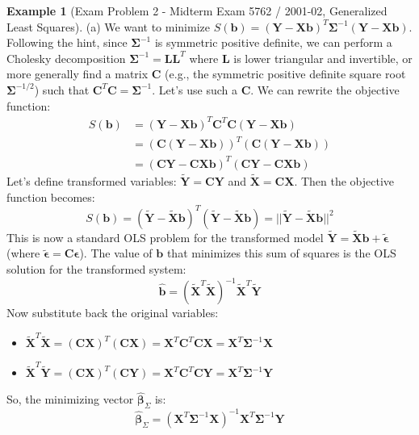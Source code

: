 \documentclass[11pt]{article}
\theoremstyle{definition}
\newtheorem{example}[theorem]{Example}
\theoremstyle{remark}
\begin{document}
\begin{example}[Exam Problem 2 - Midterm Exam 5762 / 2001-02, Generalized Least Squares]
(a) We want to minimize $S(\bm{b}) = (\bm{Y} - \bm{X}\bm{b})^T \bm{\Sigma}^{-1} (\bm{Y} - \bm{X}\bm{b})$.
Following the hint, since $\bm{\Sigma}^{-1}$ is symmetric positive definite, we can perform a Cholesky decomposition $\bm{\Sigma}^{-1} = \bm{L}\bm{L}^T$ where $\bm{L}$ is lower triangular and invertible, or more generally find a matrix $\bm{C}$ (e.g., the symmetric positive definite square root $\bm{\Sigma}^{-1/2}$) such that $\bm{C}^T \bm{C} = \bm{\Sigma}^{-1}$. Let's use such a $\bm{C}$.
We can rewrite the objective function:
\begin{align*} S(\bm{b}) &= (\bm{Y} - \bm{X}\bm{b})^T \bm{C}^T \bm{C} (\bm{Y} - \bm{X}\bm{b}) \\ &= (\bm{C}(\bm{Y} - \bm{X}\bm{b}))^T (\bm{C}(\bm{Y} - \bm{X}\bm{b})) \\ &= (\bm{C}\bm{Y} - \bm{C}\bm{X}\bm{b})^T (\bm{C}\bm{Y} - \bm{C}\bm{X}\bm{b}) \end{align*}
Let's define transformed variables: $\tilde{\bm{Y}} = \bm{C}\bm{Y}$ and $\tilde{\bm{X}} = \bm{C}\bm{X}$. Then the objective function becomes:
\[ S(\bm{b}) = (\tilde{\bm{Y}} - \tilde{\bm{X}}\bm{b})^T (\tilde{\bm{Y}} - \tilde{\bm{X}}\bm{b}) = ||\tilde{\bm{Y}} - \tilde{\bm{X}}\bm{b}||^2 \]
This is now a standard OLS problem for the transformed model $\tilde{\bm{Y}} = \tilde{\bm{X}}\bm{b} + \tilde{\bm{\epsilon}}$ (where $\tilde{\bm{\epsilon}} = \bm{C}\bm{\epsilon}$). The value of $\bm{b}$ that minimizes this sum of squares is the OLS solution for the transformed system:
\[ \hat{\bm{b}} = (\tilde{\bm{X}}^T\tilde{\bm{X}})^{-1}\tilde{\bm{X}}^T \tilde{\bm{Y}} \]
Now substitute back the original variables:
\begin{itemize}
    \item $\tilde{\bm{X}}^T\tilde{\bm{X}} = (\bm{C}\bm{X})^T (\bm{C}\bm{X}) = \bm{X}^T \bm{C}^T \bm{C} \bm{X} = \bm{X}^T \bm{\Sigma}^{-1} \bm{X}$
    \item $\tilde{\bm{X}}^T\tilde{\bm{Y}} = (\bm{C}\bm{X})^T (\bm{C}\bm{Y}) = \bm{X}^T \bm{C}^T \bm{C} \bm{Y} = \bm{X}^T \bm{\Sigma}^{-1} \bm{Y}$
\end{itemize}
So, the minimizing vector $\hat{\bm{\beta}}_{\Sigma}$ is:
\[ \hat{\bm{\beta}}_{\Sigma} = (\bm{X}^T \bm{\Sigma}^{-1} \bm{X})^{-1} \bm{X}^T \bm{\Sigma}^{-1} \bm{Y} \]


\end{example}
\end{document}
